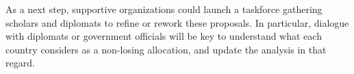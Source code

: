 \documentclass[12pt,english]{article}
\begin{document}
As a next step, supportive organizations could launch a taskforce gathering scholars and diplomats to refine or rework these proposals. In particular, dialogue with diplomats or government officials will be key to understand what each country considers as a non-losing allocation, and update the analysis in that regard.





\end{document}
